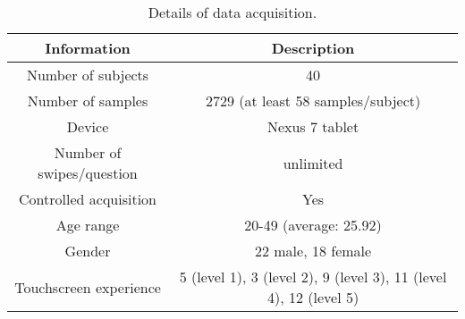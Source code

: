\documentclass[referee]{raa}            %
\begin{document}
\begin{table}
    \centering
    \begin{tabular}{|c|c|}
    \hline
        Information & Description\\
        \hline
        Number of subjects & 40\\
        \hline
        Number of samples & 2729 (at least 58 samples/subject) \\
        \hline
        Device & Nexus 7 tablet\\
        \hline
        Number of swipes/question & unlimited\\
        \hline
        Controlled acquisition & Yes\\
        \hline
        Age range & 20-49 (average: 25.92)\\
        \hline
        Gender & 22 male, 18 female\\
        \hline
        Touchscreen experience & 5 (level 1), 3 (level 2), 9 (level 3), 11 (level 4), 12 (level 5)\\
        \hline
    \end{tabular}
    \caption{Details of data acquisition.}
    \label{Tab1}
\end{table}
\end{document}
